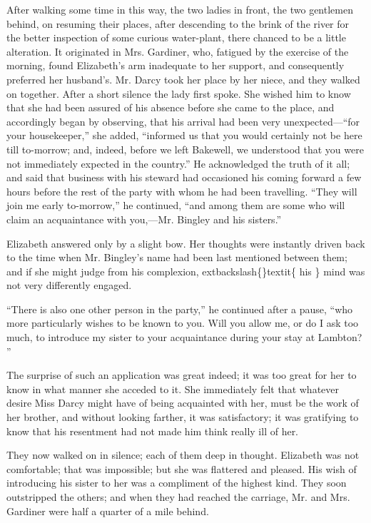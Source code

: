 \documentclass[10pt]{book}
\begin{document}
   After walking some time in this way, the two ladies in front, the two
gentlemen behind, on resuming their places, after descending to the
brink of the river for the better inspection of some curious
water-plant, there chanced to be a little alteration. It originated in
Mrs. Gardiner, who, fatigued by the exercise of the morning, found
Elizabeth’s arm inadequate to her support, and consequently preferred
her husband’s. Mr. Darcy took her place by her niece, and they walked on
together. After a short silence the lady first spoke. She wished him to
know that she had been assured of his absence before she came to the
place, and accordingly began by observing, that his arrival had been
very unexpected—“for your housekeeper,” she added, “informed us that
you would certainly not be here till to-morrow; and, indeed, before we
left Bakewell, we understood that you were not immediately expected in
the country.” He acknowledged the truth of it all; and said that
business with his steward had occasioned his coming forward a few hours
before the rest of the party with whom he had been travelling. “They
will join me early to-morrow,” he continued, “and among them are some
who will claim an acquaintance with you,—Mr. Bingley and his sisters.”
  

   Elizabeth answered only by a slight bow. Her thoughts were instantly
driven back to the time when Mr. Bingley’s name had been last mentioned
between them; and if she might judge from his complexion,
   	extbackslash\{\}textit\{
    his
   \}
   mind was
not very differently engaged.
  

   “There is also one other person in the party,” he continued after a
pause, “who more particularly wishes to be known to you. Will you allow
me, or do I ask too much, to introduce my sister to your acquaintance
during your stay at Lambton?
   ”
  

   The surprise of such an application was great indeed; it was too great
for her to know in what manner she acceded to it. She immediately felt
that whatever desire Miss Darcy might have of being acquainted with her,
must be the work of her brother, and without looking farther, it was
satisfactory; it was gratifying to know that his resentment had not made
him think really ill of her.
  

   They now walked on in silence; each of them deep in thought. Elizabeth
was not comfortable; that was impossible; but she was flattered and
pleased. His wish of introducing his sister to her was a compliment of
the highest kind. They soon outstripped the others; and when they had
reached the carriage, Mr. and Mrs. Gardiner were half a quarter of a
mile behind.
  
\end{document}

